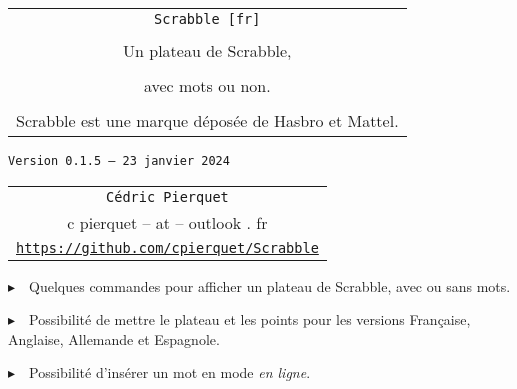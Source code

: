 \documentclass{article}
\def\TPversion{0.1.5}
\def\TPdate{23 janvier 2024}
\begin{document}
\pagestyle{fancy}

\thispagestyle{empty}

\vspace{2cm}

\begin{center}
	\begin{minipage}{0.75\linewidth}
	\begin{tcolorbox}[colframe=yellow,colback=yellow!15]
		\begin{center}
			\begin{tabular}{c}
				{\Huge \texttt{Scrabble [fr]}}\\
				\\
				{\LARGE Un plateau de Scrabble,} \\
				\\
				{\LARGE avec mots ou non.} \\
				\\
				{Scrabble\texttrademark{} est une marque déposée de Hasbro\texttrademark{} et Mattel\texttrademark{}.}
			\end{tabular}
			
			\medskip
			
			{\small \texttt{Version \TPversion{} -- \TPdate}}
		\end{center}
	\end{tcolorbox}
\end{minipage}
\end{center}

\vspace{0.5cm}

\begin{center}
	\begin{tabular}{c}
	\texttt{Cédric Pierquet}\\
	{\ttfamily c pierquet -- at -- outlook . fr}\\
	\texttt{\url{https://github.com/cpierquet/Scrabble}}
\end{tabular}
\end{center}

\vspace{0.5cm}

{$\blacktriangleright$~~Quelques commandes pour afficher un plateau de Scrabble, avec ou sans mots.}

\smallskip

{$\blacktriangleright$~~Possibilité de mettre le plateau et les points pour les versions Française, Anglaise, Allemande et Espagnole.}

\smallskip

{$\blacktriangleright$~~Possibilité d'insérer un mot en mode \textit{en ligne}.}
\end{document}

